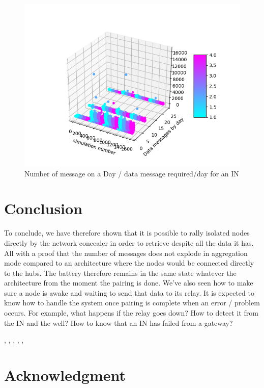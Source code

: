 \documentclass[conference]{IEEEtran}
\begin{document}
\begin{figure}[htbp]
\centerline{\includegraphics[scale=0.5]{graphics_resultats/msg/Sim-MSG_IN-MSG_SEND-degree_GW.png}}
\caption{Number of message on a Day / data message required/day for an IN}
\label{A}
\end{figure}


\newpage
\section{Conclusion}

To conclude, we have therefore shown that it is possible to rally isolated nodes directly by the network concealer in order to retrieve despite all the data it has. All with a proof that the number of messages does not explode in aggregation mode compared to an architecture where the nodes would be connected directly to the hubs. The battery therefore remains in the same state whatever the architecture from the moment the pairing is done.
We've also seen how to make sure a node is awake and waiting to send that data to its relay.
It is expected to know how to handle the system once pairing is complete when an error / problem occurs. For example, what happens if the relay goes down? How to detect it from the IN and the well? How to know that an IN has failed from a gateway?




\cite{Tanaka2018},
\cite{Singh2012},
\cite{Ng2013},
\cite{Palan2017},
\cite{Sharma2006},
\cite{Haddad2009}
\section*{Acknowledgment}




% 
% 
\end{document}
